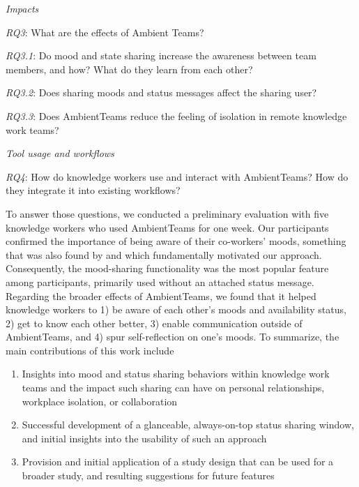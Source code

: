 \medskip\noindent\textit{Impacts}

\smallskip\noindent\textit{RQ3}: What are the effects of Ambient Teams?

\setlength{\leftskip}{0.5cm}
\smallskip\noindent\textit{RQ3.1}: Do mood and state sharing increase the awareness between team members, and how? What do they learn from each other?

\smallskip\noindent\textit{RQ3.2}: Does sharing moods and status messages affect the sharing user?


\smallskip\noindent\textit{RQ3.3}: Does AmbientTeams reduce the feeling of isolation in remote knowledge work teams?

\setlength{\leftskip}{0pt}

\medskip\noindent\textit{Tool usage and workflows}

\smallskip\noindent\textit{RQ4}: How do knowledge workers use and interact with AmbientTeams? How do they integrate it into existing workflows?

\bigskip\noindent To answer those questions, we conducted a preliminary evaluation with five knowledge workers who used AmbientTeams for one week. Our participants confirmed the importance of being aware of their co-workers' moods, something that was also found by \textcite{garcia1999emotional, dullemond2013fixing} and which fundamentally motivated our approach. Consequently, the mood-sharing functionality was the most popular feature among participants, primarily used without an attached status message. Regarding the broader effects of AmbientTeams, we found that it helped knowledge workers to 1) be aware of each other's moods and availability status, 2) get to know each other better, 3) enable communication outside of AmbientTeams, and 4) spur self-reflection on one's moods. To summarize, the main contributions of this work include

\begin{enumerate}
    \item Insights into mood and status sharing behaviors within knowledge work teams and the impact such sharing can have on personal relationships, workplace isolation, or collaboration
    \item Successful development of a glanceable, always-on-top status sharing window, and initial insights into the usability of such an approach
    \item Provision and initial application of a study design that can be used for a broader study, and resulting suggestions for future features
\end{enumerate}

